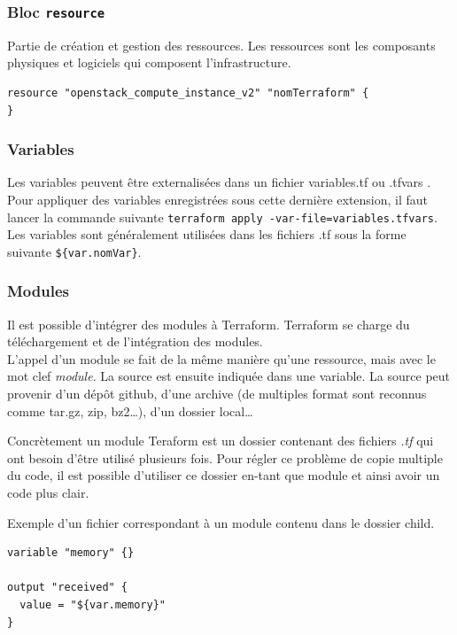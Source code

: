 \documentclass[]{article}
\begin{document}
\subsubsection{\texorpdfstring{Bloc
\textbf{\texttt{resource}}}{Bloc resource}}\label{bloc-resource}

Partie de création et gestion des ressources. Les ressources sont les composants physiques et logiciels qui composent l'infrastructure.

\begin{verbatim}
resource "openstack_compute_instance_v2" "nomTerraform" {
}
\end{verbatim}

\subsubsection{Variables}\label{variables}

Les variables peuvent être externalisées dans un fichier
\og variables.tf \fg ou \og
.tfvars \fg. Pour appliquer des variables enregistrées
sous cette dernière extension, il faut lancer la commande suivante
\texttt{terraform\ apply\ -var-file=variables.tfvars}. Les variables sont
généralement utilisées dans les fichiers .tf sous la forme suivante
\texttt{\$\{var.nomVar\}}.

\subsubsection{Modules}\label{modules}

Il est possible d'intégrer des modules à Terraform. Terraform se charge
du téléchargement et de l'intégration des modules. \\
L'appel d'un module
se fait de la même manière qu'une ressource, mais avec le mot clef
\emph{module}. La source est ensuite indiquée dans une variable. La
source peut provenir d'un dépôt github, d'une archive (de multiples
format sont reconnus comme tar.gz, zip, bz2\ldots{}), d'un dossier
local\ldots{} 

Concrètement un module Teraform est un dossier contenant
des fichiers \emph{.tf} qui ont besoin d'être utilisé plusieurs fois.
Pour régler ce problème de copie multiple du code, il est possible
d'utiliser ce dossier en-tant que module et ainsi avoir un code plus
clair.

Exemple d'un fichier correspondant à un module contenu dans le dossier child.
\begin{verbatim}
variable "memory" {}

output "received" {
  value = "${var.memory}"
}
\end{verbatim}
\end{document}
